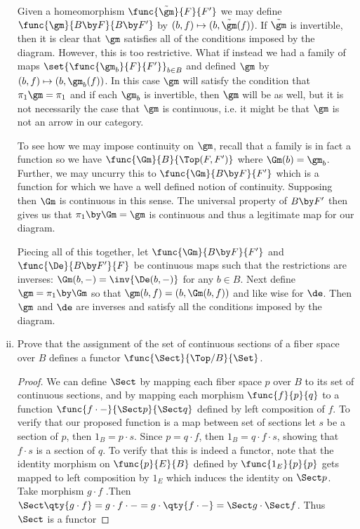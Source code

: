 \documentclass[main.tex]{subfiles}
\begin{document}
\begin{exercise}
\begin{enumerate}[(i),resume]
			Given a homeomorphism \(\func{\tilde{\gm}}{F}{F'}\) we may define
			\(\func{\gm}{B\by F}{B\by F'}\) by
			\((b,f)\mapsto(b,\tilde{\gm}(f))\). If \(\tilde{\gm}\) is
			invertible, then it is clear that \(\gm\) satisfies all of the
			conditions imposed by the diagram. However, this is too restrictive.
			What if instead we had a family of maps
			\(\set{\func{\gm_b}{F}{F'}}_{b\in B}\) and defined \(\gm\) by
			\((b,f)\mapsto(b,\gm_b(f))\). In this case \(\gm\) will satisfy the
			condition that \(\pi_1\gm=\pi_1\) and if each \(\gm_b\) is
			invertible, then \(\gm\) will be as well, but it is not necessarily
			the case that \(\gm\) is continuous, i.e. it might be that \(\gm\)
			is not an arrow in our category.

			To see how we may impose continuity on \(\gm\), recall that a family
			is in fact a function so we have \(\func{\Gm}{B}{\Top(F,F')}\) where
			\(\Gm(b)=\gm_b\). Further, we may uncurry this to
			\(\func{\Gm}{B\by F}{F'}\) which is a function for which we have a
			well defined notion of continuity. Supposing then \(\Gm\) is
			continuous in this sense. The universal property of \(B\by F'\) then
			gives us that \(\pi_1\by\Gm=\gm\) is continuous and thus a
			legitimate map for our diagram.

			Piecing all of this together, let \(\func{\Gm}{B\by F}{F'}\) and
			\(\func{\De}{B\by F'}{F}\) be continuous maps such that the
			restrictions are inverses:
			\(\Gm(b,-)=\inv{\De(b,-)}\) for any \(b\in B\). Next define
			\(\gm=\pi_1\by\Gm\) so that \(\gm(b,f)=(b,\Gm(b,f))\) and like wise
			for \(\de\). Then \(\gm\) and \(\de\) are inverses and satisfy all
			the conditions imposed by the diagram.

		\item Prove that the assignment of the set of continuous sections of a
			fiber space over \(B\) defines a functor
			\(\func{\Sect}{\Top/B}{\Set}\).
			\begin{proof}
				We can define $\Sect$ by mapping each fiber space $p$ over $B$
				to its set of continuous sections, and by mapping each morphism
				$\func{f}{p}{q}$ to a function $\func{f \cdot -}{\Sect p}{\Sect
				q}$ defined by left composition of $f$. To verify that our
				proposed function is a map between set of sections let $s$ be a
				section of $p$, then $1_{B} = p \cdot s$. Since $p = q \cdot f$,
				then $1_{B} = q \cdot f \cdot s$, showing that $f \cdot s$ is a
				section of $q$. To verify that this is indeed a functor, note
				that the identity morphism on $\func{p}{E}{B}$ defined by
				$\func{1_{E}}{p}{p}$ gets mapped to left composition by $1_{E}$
				which induces the identity on $\Sect p$. Take morphism $g \cdot
				f$ .Then $\Sect \qty{g \cdot f} = g \cdot f \cdot - = g \cdot
				\qty{f \cdot -} = \Sect g \cdot \Sect f$. Thus $\Sect$ is a
				functor
			\end{proof}


\end{enumerate}
\end{exercise}
\end{document}
